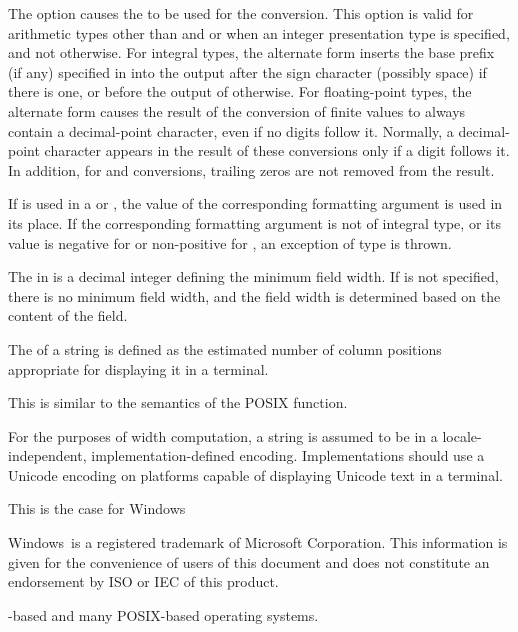 \pnum
The \noncxxtcode{\#} option causes the
to be used for the conversion.
This option is valid for arithmetic types other than
 and 
or when an integer presentation type is specified, and not otherwise.
For integral types,
the alternate form inserts the
base prefix (if any) specified in 
into the output after the sign character (possibly space) if there is one, or
before the output of  otherwise.
For floating-point types,
the alternate form causes the result of the conversion of finite values
to always contain a decimal-point character,
even if no digits follow it.
Normally, a decimal-point character appears in the result of these
conversions only if a digit follows it.
In addition, for  and  conversions,
trailing zeros are not removed from the result.

\pnum
If  is used in
a  or ,
the value of the corresponding formatting argument is used in its place.
If the corresponding formatting argument is not of integral type, or
its value is
negative for  or
non-positive for ,
an exception of type  is thrown.

\pnum
The  in
 is a decimal integer defining the minimum field width.
If  is not specified,
there is no minimum field width, and
the field width is determined based on the content of the field.

\pnum
{}%
The  of a string is defined as
the estimated number of column positions appropriate
for displaying it in a terminal.
\begin{note}
This is similar to the semantics of the POSIX  function.
\end{note}

\pnum
For the purposes of width computation,
a string is assumed to be in
a locale-independent, implementation-defined encoding.
Implementations should use a Unicode encoding
on platforms capable of displaying Unicode text in a terminal.
\begin{note}
This is the case for Windows
\begin{footnote}
Windows\textregistered\ is a registered trademark of Microsoft Corporation.
This information is given for the convenience of users of this document and
does not constitute an endorsement by ISO or IEC of this product.
\end{footnote}%
-based and
many POSIX-based operating systems.
\end{note}

